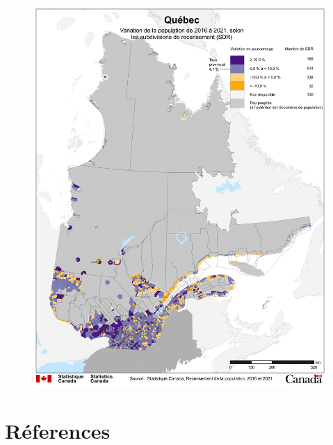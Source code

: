 \documentclass[conference,final,]{IEEEtran}
\begin{document}
\begin{figure}[H]
  \centering
  \includegraphics[width=\linewidth]{densite.png}
\end{figure}

\newpage

\section*{Réferences}\label{references}
\end{document}

